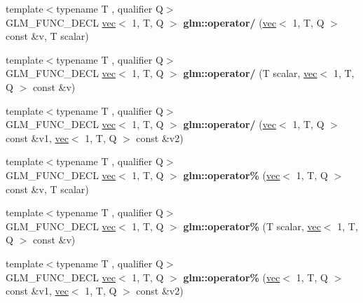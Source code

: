 \begin{DoxyCompactItemize}
\item 
\mbox{\label{group__ext__vec1_ga5f0627715e89fde4a13b5655961df660}} 
{\footnotesize template$<$typename T , qualifier Q$>$ }\\G\+L\+M\+\_\+\+F\+U\+N\+C\+\_\+\+D\+E\+CL \hyperlink{structglm_1_1vec}{vec}$<$ 1, T, Q $>$ {\bfseries glm\+::operator/} (\hyperlink{structglm_1_1vec}{vec}$<$ 1, T, Q $>$ const \&v, T scalar)
\item 
\mbox{\label{group__ext__vec1_ga851316b0b0cb8d83400d192036a1b128}} 
{\footnotesize template$<$typename T , qualifier Q$>$ }\\G\+L\+M\+\_\+\+F\+U\+N\+C\+\_\+\+D\+E\+CL \hyperlink{structglm_1_1vec}{vec}$<$ 1, T, Q $>$ {\bfseries glm\+::operator/} (T scalar, \hyperlink{structglm_1_1vec}{vec}$<$ 1, T, Q $>$ const \&v)
\item 
\mbox{\label{group__ext__vec1_ga1199db3fccd25c9b695894159fa12ac8}} 
{\footnotesize template$<$typename T , qualifier Q$>$ }\\G\+L\+M\+\_\+\+F\+U\+N\+C\+\_\+\+D\+E\+CL \hyperlink{structglm_1_1vec}{vec}$<$ 1, T, Q $>$ {\bfseries glm\+::operator/} (\hyperlink{structglm_1_1vec}{vec}$<$ 1, T, Q $>$ const \&v1, \hyperlink{structglm_1_1vec}{vec}$<$ 1, T, Q $>$ const \&v2)
\item 
\mbox{\label{group__ext__vec1_gac7110fb284669c629075b3ab29ad9b4f}} 
{\footnotesize template$<$typename T , qualifier Q$>$ }\\G\+L\+M\+\_\+\+F\+U\+N\+C\+\_\+\+D\+E\+CL \hyperlink{structglm_1_1vec}{vec}$<$ 1, T, Q $>$ {\bfseries glm\+::operator\%} (\hyperlink{structglm_1_1vec}{vec}$<$ 1, T, Q $>$ const \&v, T scalar)
\item 
\mbox{\label{group__ext__vec1_gafaa74182cb9679e2b23567fc4da42bf8}} 
{\footnotesize template$<$typename T , qualifier Q$>$ }\\G\+L\+M\+\_\+\+F\+U\+N\+C\+\_\+\+D\+E\+CL \hyperlink{structglm_1_1vec}{vec}$<$ 1, T, Q $>$ {\bfseries glm\+::operator\%} (T scalar, \hyperlink{structglm_1_1vec}{vec}$<$ 1, T, Q $>$ const \&v)
\item 
\mbox{\label{group__ext__vec1_ga1a6ce0ed38acf01fa29b2ad451175496}} 
{\footnotesize template$<$typename T , qualifier Q$>$ }\\G\+L\+M\+\_\+\+F\+U\+N\+C\+\_\+\+D\+E\+CL \hyperlink{structglm_1_1vec}{vec}$<$ 1, T, Q $>$ {\bfseries glm\+::operator\%} (\hyperlink{structglm_1_1vec}{vec}$<$ 1, T, Q $>$ const \&v1, \hyperlink{structglm_1_1vec}{vec}$<$ 1, T, Q $>$ const \&v2)

\end{DoxyCompactItemize}
